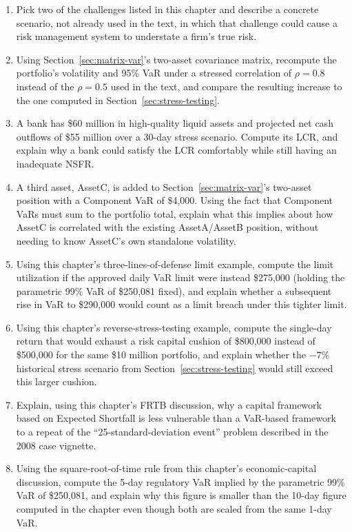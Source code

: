 \documentclass[../ai_in_finance]{subfiles}
\begin{document}
\begin{enumerate}[exercises]
    \item Pick two of the challenges listed in this chapter and describe a concrete scenario, not already used in the text, in which that challenge could cause a risk management system to understate a firm's true risk.
    \item Using Section~\ref{sec:matrix-var}'s two-asset covariance matrix, recompute the portfolio's volatility and 95\% VaR under a stressed correlation of $\rho=0.8$ instead of the $\rho=0.5$ used in the text, and compare the resulting increase to the one computed in Section~\ref{sec:stress-testing}.
    \item A bank has \$60 million in high-quality liquid assets and projected net cash outflows of \$55 million over a 30-day stress scenario. Compute its LCR, and explain why a bank could satisfy the LCR comfortably while still having an inadequate NSFR.
    \item A third asset, AssetC, is added to Section~\ref{sec:matrix-var}'s two-asset position with a Component VaR of \$4,000. Using the fact that Component VaRs must sum to the portfolio total, explain what this implies about how AssetC is correlated with the existing AssetA/AssetB position, without needing to know AssetC's own standalone volatility.
    \item Using this chapter's three-lines-of-defense limit example, compute the limit utilization if the approved daily VaR limit were instead \$275,000 (holding the parametric 99\% VaR of \$250,081 fixed), and explain whether a subsequent rise in VaR to \$290,000 would count as a limit breach under this tighter limit.
    \item Using this chapter's reverse-stress-testing example, compute the single-day return that would exhaust a risk capital cushion of \$800,000 instead of \$500,000 for the same \$10 million portfolio, and explain whether the $-7\%$ historical stress scenario from Section~\ref{sec:stress-testing} would still exceed this larger cushion.
    \item Explain, using this chapter's FRTB discussion, why a capital framework based on Expected Shortfall is less vulnerable than a VaR-based framework to a repeat of the ``25-standard-deviation event'' problem described in the 2008 case vignette.
    \item Using the square-root-of-time rule from this chapter's economic-capital discussion, compute the 5-day regulatory VaR implied by the parametric 99\% VaR of \$250,081, and explain why this figure is smaller than the 10-day figure computed in the chapter even though both are scaled from the same 1-day VaR.

\end{enumerate}
\end{document}
